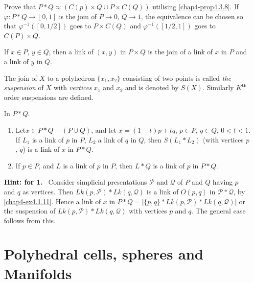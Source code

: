 \begin{ex}\label{chap4-ex4.3.20}
Prove that $P\ast Q\approx (C(p)\times Q\cup P\times C(Q))$ utilising \ref{chap4-prop4.3.8}. If $\varphi:P\ast Q\to [0,1]$ is the join of $P\to 0$, $Q\to 1$, the equivalence can be chosen so that $\varphi^{-1}([0,1/2])$ goes to $P\times C(Q)$ and $\varphi^{-1}([1/2,1])$ goes to $C(P)\times Q$.
\end{ex}

\begin{ex}\label{chap4-ex4.3.21}
If $x\in P$, $y\in Q$, then a link of $(x,y)$ in $P\times Q$ is the join of a link of $x$ in $P$ and a link of $y$ in $Q$.
\end{ex}

The join of $X$ to a polyhedron $\{x_{1},x_{2}\}$ consisting of two points is called {\em the suspension} of $X$ with {\em vertices} $x_{1}$ and $x_{2}$ and is denoted by $S(X)$. Similarly $K^{\text{th}}$ order suspensions are defined.

\begin{ex}\label{chap4-ex4.3.22}
In $P\ast Q$.
\begin{enumerate}
\renewcommand{\labelenumi}{(\theenumi)}
\item  Let\pageoriginale $x\in P\ast Q-(P\cup Q)$, and let $x=(1-t)p+tq$, $p\in P$, $q\in Q$, $0<t<1$. If $L_{1}$ is a link of $p$ in $P$, $L_{2}$ a link of $q$ in $Q$, then $S(L_{1}\ast L_{2})$ (with vertices $p$, $q$) is a link of $x$ in $P\ast Q$.

\item If $p\in P$, and $L$ is a link of $p$ in $P$, then $L\ast Q$ is a link of $p$ in $P\ast Q$.
\end{enumerate}
\end{ex}

\noindent
{\bf Hint: for 1.}~ Consider simplicial presentations $\mathscr{P}$
and $\mathcal{Q}$ of $P$ and $Q$ having $p$ and $q$ as vertices. Then $Lk(p,\mathscr{P})\ast Lk(q,\mathcal{Q})$ is a link of $O(p,q)$ in $\mathscr{P}\ast \mathcal{Q}$, by \ref{chap4-ex4.1.11}. Hence a link of $x$ in $P\ast Q=|\{p,q\}\ast Lk(p,\mathscr{P})\ast Lk(q,\mathcal{Q})|$ or the suspension of $Lk(p,\mathscr{P})\ast Lk(q,\mathcal{Q})$ with vertices $p$ and $q$. The general case follows from this.

\section{Polyhedral cells, spheres and Manifolds}\label{chap4-sec4.4}

